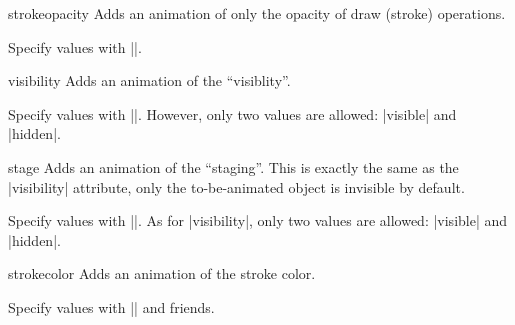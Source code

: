 \begin{sysanimateattribute}{strokeopacity}
  Adds an animation of only the opacity of draw (stroke) operations.
  
  Specify values with |\pgfsys@animation@val@scalar|.
  
\begin{codeexample}[width=2cm]
\end{codeexample}
\end{sysanimateattribute}

\begin{sysanimateattribute}{visibility}
  Adds an animation of the ``visiblity''.
  
  Specify values with |\pgfsys@animation@val@text|. However, only two values are allowed:
  |visible| and |hidden|.
\begin{codeexample}[width=2cm]
\end{codeexample}
\end{sysanimateattribute}

\begin{sysanimateattribute}{stage}
  Adds an animation of the ``staging''. This is exactly the same as
  the |visibility| attribute, only the to-be-animated object is
  invisible by default. 
  
  Specify values with |\pgfsys@animation@val@text|. As for
  |visibility|, only two values are allowed: 
  |visible| and |hidden|.
\begin{codeexample}[width=4cm]
\end{codeexample}
\end{sysanimateattribute}

\begin{sysanimateattribute}{strokecolor}
  Adds an animation of the stroke color.

  Specify values with |\pgfsys@animation@val@color@rgb| and friends.
\begin{codeexample}[width=2cm]
\end{codeexample}
\end{sysanimateattribute}

